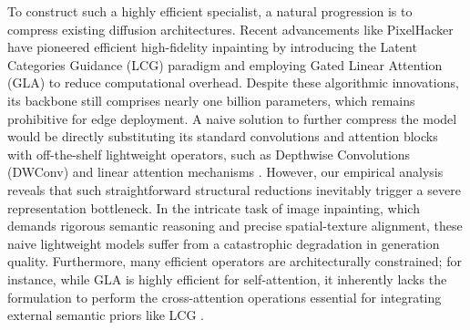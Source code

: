 \documentclass{llmxive}
\begin{document}
\vspace{-0.5em}
To construct such a highly efficient specialist, a natural progression is to compress existing diffusion architectures. Recent advancements like PixelHacker \cite{xu2025pixelhacker} have pioneered efficient high-fidelity inpainting by introducing the Latent Categories Guidance (LCG) paradigm and employing Gated Linear Attention (GLA) \cite{yang2024gla} to reduce computational overhead. Despite these algorithmic innovations, its backbone still comprises nearly one billion parameters, which remains prohibitive for edge deployment. A naive solution to further compress the model would be directly substituting its standard convolutions and attention blocks with off-the-shelf lightweight operators, such as Depthwise Convolutions (DWConv) \cite{Sandler2018MobileNetV2} and linear attention mechanisms \cite{yang2024gla,dao2022flashattention,dao2023flashattention2}. However, our empirical analysis reveals that such straightforward structural reductions inevitably trigger a severe representation bottleneck. In the intricate task of image inpainting, which demands rigorous semantic reasoning and precise spatial-texture alignment, these naive lightweight models suffer from a catastrophic degradation in generation quality. Furthermore, many efficient operators are architecturally constrained; for instance, while GLA \cite{yang2024gla} is highly efficient for self-attention, it inherently lacks the formulation to perform the cross-attention operations essential for integrating external semantic priors like LCG \cite{xu2025pixelhacker}.
\end{document}
